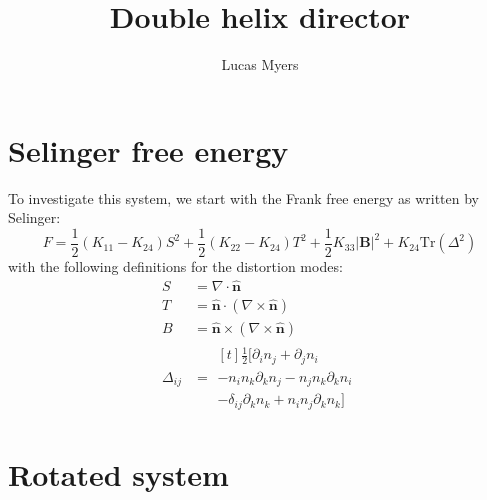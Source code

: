 \documentclass[reqno]{article}
\newcommand{\Tr}{\text{Tr}}
\newcommand{\n}{\hat{\mathbf{n}}}
\begin{document}
\title{Double helix director}
\author{Lucas Myers}
\maketitle

\section{Selinger free energy}

To investigate this system, we start with the Frank free energy as written by Selinger:
\begin{equation}
    F
    =
    \frac12 \left(K_{11} - K_{24}\right) S^2
    + \frac12 \left(K_{22} - K_{24}\right) T^2
    + \frac12 K_{33} \left| \mathbf{B} \right|^2
    + K_{24} \Tr \left( \Delta^2 \right)
\end{equation}
with the following definitions for the distortion modes:
\begin{align}
    S &= \nabla \cdot \n \\
    T &= \n \cdot \left(\nabla \times \n \right) \\
    B &= \n \times \left( \nabla \times \n \right) \\
    \Delta_{ij} &=
    \begin{multlined}[t]
        \frac12 \bigl[
            \partial_i n_j 
            + \partial_j n_i \\
            - n_i n_k \partial_k n_j
            - n_j n_k \partial_k n_i \\
            - \delta_{ij} \partial_k n_k
            + n_i n_j \partial_k n_k
        \bigr]
    \end{multlined}
\end{align}

\section{Rotated system}
\end{document}
